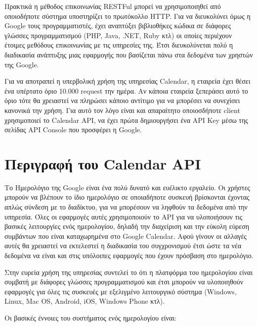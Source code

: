 Πρακτικά η μέθοδος επικοινωνίας RESTFul μπορεί να χρησιμοποιηθεί από οποιοδήποτε σύστημα υποστηρίζει το πρωτόκολλο HTTP. Για να διευκολύνει όμως η Google τους προγραμματιστές, έχει αναπτύξει βιβλιοθήκες κώδικα σε διάφορες γλώσσες προγραμματισμού (PHP, Java, .NET, Ruby κτλ) οι οποίες περιέχουν έτοιμες μεθόδους επικοινωνίας με τις υπηρεσίες της. Έτσι διευκολύνεται πολύ η διαδικασία ανάπτυξης μιας εφαρμογής που βασίζεται πάνω στα δεδομένα των χρηστών της Google.

Για να αποτραπεί η υπερβολική χρήση της υπηρεσίας Calendar, η εταιρεία έχει θέσει ένα υπέρτατο όριο 10.000 request την ημέρα. Αν κάποια εταιρεία ξεπεράσει αυτό το όριο τότε θα χρειαστεί να πληρώσει κάποιο αντίτιμο για να μπορέσει να συνεχίσει κανονικά την χρήση. Για αυτό τον λόγο είναι και απαραίτητο οποιοσδήποτε client χρησιμοποιεί το Calendar API, να έχει πρώτα δημιουργήσει ένα API Key μέσω της σελίδας API Console που προσφέρει η Google.

\section {Περιγραφή του Calendar API}
Το Ημερολόγιο της Google είναι ένα πολύ δυνατό και ευέλικτο εργαλείο. Οι χρήστες μπορούν να βλέπουν το ίδιο ημερολόγιο σε οποιαδήποτε συσκευή βρίσκονται έχοντας απλώς σύνδεση με το διαδίκτυο, για να μπορέσουν να ληφθούν τα δεδομένα από την υπηρεσία. Όλες οι εφαρμογές αυτές χρησιμοποιούν το API για να υλοποιήσουν τις βασικές λειτουργίες ενός ημερολογίου, δηλαδή την διαχείριση και την εύκολη εύρεση συμβάντων που είναι καταχωρημένα στο Google Calendar. Αφού γίνουν οι αλλαγές αυτές θα χρειαστεί να εκτελεστεί η διαδικασία του συγχρονισμού έτσι ώστε τα νέα δεδομένα να είναι και στις υπόλοιπες εφαρμογές που έχουν πρόσβαση στο ημερολόγιο. 

Στην ευρεία χρήση της υπηρεσίας συντελεί το ότι η πλατφόρμα του ημερολογίου είναι συμβατή με διάφορες γλώσσες προγραμματισμού και έτσι μπορούν να υλοποιηθούν εφαρμογές για όλες τις συσκευές με εξελιγμένο λειτουργικό σύστημα (Windows, Linux, Mac OS, Android, iOS, Windows Phone κτλ).

Οι βασικές έννοιες του συστήματος ενός ημερολογίου είναι:

